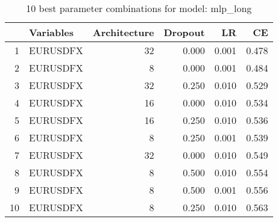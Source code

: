 \begin{table}[ht]
\centering
\begin{tabular}{rlrrrr}
  \hline
 & Variables & Architecture & Dropout & LR & CE \\ 
  \hline
1 & EURUSDFX &   32 & 0.000 & 0.001 & 0.478 \\ 
  2 & EURUSDFX &    8 & 0.000 & 0.001 & 0.484 \\ 
  3 & EURUSDFX &   32 & 0.250 & 0.010 & 0.529 \\ 
  4 & EURUSDFX &   16 & 0.000 & 0.010 & 0.534 \\ 
  5 & EURUSDFX &   16 & 0.250 & 0.010 & 0.536 \\ 
  6 & EURUSDFX &    8 & 0.250 & 0.001 & 0.539 \\ 
  7 & EURUSDFX &   32 & 0.000 & 0.010 & 0.549 \\ 
  8 & EURUSDFX &    8 & 0.500 & 0.010 & 0.554 \\ 
  9 & EURUSDFX &    8 & 0.500 & 0.001 & 0.556 \\ 
  10 & EURUSDFX &    8 & 0.250 & 0.010 & 0.563 \\ 
   \hline
\end{tabular}
\caption{10 best parameter combinations for model: mlp_long} 
\label{tab:mlp_long_top_10}
\end{table}
